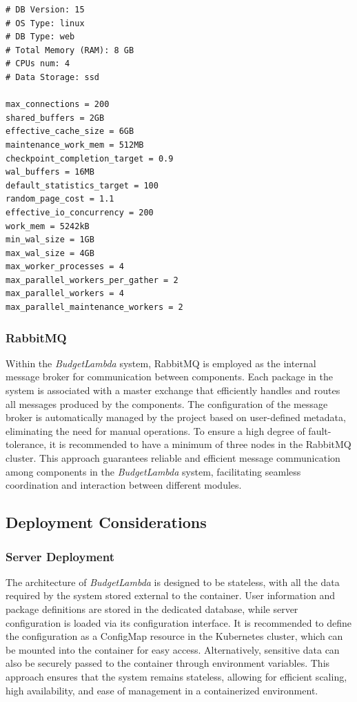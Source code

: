 \documentclass[fleqn,10pt]{SelfArx} %
\begin{document}
\begin{verbatim}
# DB Version: 15
# OS Type: linux
# DB Type: web
# Total Memory (RAM): 8 GB
# CPUs num: 4
# Data Storage: ssd

max_connections = 200
shared_buffers = 2GB
effective_cache_size = 6GB
maintenance_work_mem = 512MB
checkpoint_completion_target = 0.9
wal_buffers = 16MB
default_statistics_target = 100
random_page_cost = 1.1
effective_io_concurrency = 200
work_mem = 5242kB
min_wal_size = 1GB
max_wal_size = 4GB
max_worker_processes = 4
max_parallel_workers_per_gather = 2
max_parallel_workers = 4
max_parallel_maintenance_workers = 2
\end{verbatim}

\subsubsection{RabbitMQ}

Within the \emph{BudgetLambda} system, RabbitMQ is employed as the internal message broker for communication between components. Each package in the system is associated with a master exchange that efficiently handles and routes all messages produced by the components. The configuration of the message broker is automatically managed by the project based on user-defined metadata, eliminating the need for manual operations. To ensure a high degree of fault-tolerance, it is recommended to have a minimum of three nodes in the RabbitMQ cluster. This approach guarantees reliable and efficient message communication among components in the \emph{BudgetLambda} system, facilitating seamless coordination and interaction between different modules.

\subsection{Deployment Considerations}

\subsubsection{Server Deployment}
The architecture of \emph{BudgetLambda} is designed to be stateless, with all the data required by the system stored external to the container. User information and package definitions are stored in the dedicated database, while server configuration is loaded via its configuration interface. It is recommended to define the configuration as a ConfigMap resource in the Kubernetes cluster, which can be mounted into the container for easy access. Alternatively, sensitive data can also be securely passed to the container through environment variables. This approach ensures that the system remains stateless, allowing for efficient scaling, high availability, and ease of management in a containerized environment.
\end{document}
